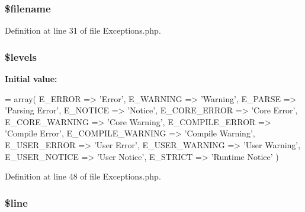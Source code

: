 \subsubsection[{\$filename}]{\setlength{\rightskip}{0pt plus 5cm}\$filename}\label{class_c_i___exceptions_a0722441477f957078ee2437054556cbc}


Definition at line 31 of file Exceptions.\-php.

\subsubsection[{\$levels}]{\setlength{\rightskip}{0pt plus 5cm}\$levels}\label{class_c_i___exceptions_a1035dc0448354cc79f8f9e1ca8dfd0cb}
{\bfseries Initial value\-:}
\begin{DoxyCode}
= array(
                        E\_ERROR             =>  \textcolor{stringliteral}{'Error'},
                        E\_WARNING           =>  \textcolor{stringliteral}{'Warning'},
                        E\_PARSE             =>  \textcolor{stringliteral}{'Parsing Error'},
                        E\_NOTICE            =>  \textcolor{stringliteral}{'Notice'},
                        E\_CORE\_ERROR        =>  \textcolor{stringliteral}{'Core Error'},
                        E\_CORE\_WARNING      =>  \textcolor{stringliteral}{'Core Warning'},
                        E\_COMPILE\_ERROR     =>  \textcolor{stringliteral}{'Compile Error'},
                        E\_COMPILE\_WARNING   =>  \textcolor{stringliteral}{'Compile Warning'},
                        E\_USER\_ERROR        =>  \textcolor{stringliteral}{'User Error'},
                        E\_USER\_WARNING      =>  \textcolor{stringliteral}{'User Warning'},
                        E\_USER\_NOTICE       =>  \textcolor{stringliteral}{'User Notice'},
                        E\_STRICT            =>  \textcolor{stringliteral}{'Runtime Notice'}
                    )
\end{DoxyCode}


Definition at line 48 of file Exceptions.\-php.

\subsubsection[{\$line}]{\setlength{\rightskip}{0pt plus 5cm}\$line}\label{class_c_i___exceptions_a52f469b0182d9abac2d0f20548680c9c}


